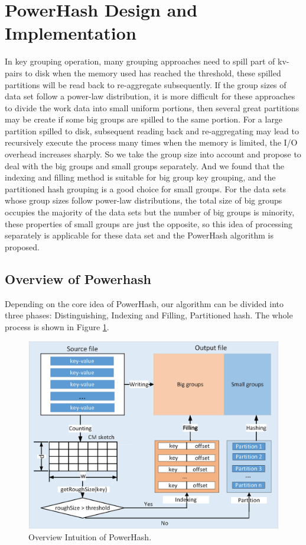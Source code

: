 \section{PowerHash Design and Implementation}
\label{sec:hash}

In key grouping operation, many grouping approaches need to spill part of kv-pairs to disk when the memory used has reached the threshold, these spilled partitions will be read back to re-aggregate subsequently. If the group sizes of data set follow a power-law distribution, 
it is more difficult for these approaches to divide the work data into small uniform portions, then several great partitions may be create if some big groups are spilled to the same portion. For a large partition spilled to disk, subsequent reading back and re-aggregating may lead to recursively execute the process many times when the memory is limited, the I/O overhead increases sharply. So we take the group size into account and propose to deal with the big groups and small groups separately. And we found that the indexing and filling method is suitable for big group key grouping, and the partitioned hash grouping is a good choice for small groups. For the data sets whose group sizes follow power-law distributions, the total size of big groups occupies the majority of the data sets but the number of big groups is minority, these properties of small groups are just the opposite, so this idea of processing separately is applicable for these data set and the PowerHash algorithm is proposed. 

\subsection{Overview of Powerhash}%
Depending on the core idea of PowerHash, our algorithm can be divided into three phases: Distinguishing, Indexing and Filling, Partitioned hash. The whole process is shown in Figure \ref{fig:pwHash}.
\begin{figure}
\includegraphics[width=.5\textwidth]{fig/pwhash}
\caption{Overview Intuition of PowerHash.}
\label{fig:pwHash}
\end{figure}

